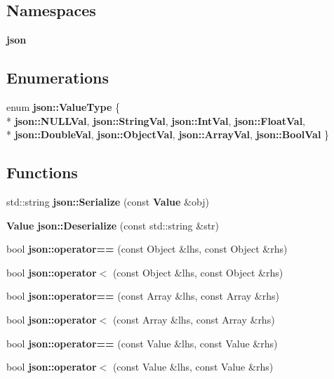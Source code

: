 \subsection*{Namespaces}
\begin{DoxyCompactItemize}
\item 
 {\bf json}
\end{DoxyCompactItemize}
\subsection*{Enumerations}
\begin{DoxyCompactItemize}
\item 
enum {\bf json\+::\+Value\+Type} \{ \\*
{\bf json\+::\+N\+U\+L\+L\+Val}, 
{\bf json\+::\+String\+Val}, 
{\bf json\+::\+Int\+Val}, 
{\bf json\+::\+Float\+Val}, 
\\*
{\bf json\+::\+Double\+Val}, 
{\bf json\+::\+Object\+Val}, 
{\bf json\+::\+Array\+Val}, 
{\bf json\+::\+Bool\+Val}
 \}
\end{DoxyCompactItemize}
\subsection*{Functions}
\begin{DoxyCompactItemize}
\item 
std\+::string {\bf json\+::\+Serialize} (const {\bf Value} \&obj)
\item 
{\bf Value} {\bf json\+::\+Deserialize} (const std\+::string \&str)
\item 
bool {\bf json\+::operator==} (const Object \&lhs, const Object \&rhs)
\item 
bool {\bf json\+::operator$<$} (const Object \&lhs, const Object \&rhs)
\item 
bool {\bf json\+::operator==} (const Array \&lhs, const Array \&rhs)
\item 
bool {\bf json\+::operator$<$} (const Array \&lhs, const Array \&rhs)
\item 
bool {\bf json\+::operator==} (const Value \&lhs, const Value \&rhs)
\item 
bool {\bf json\+::operator$<$} (const Value \&lhs, const Value \&rhs)
\end{DoxyCompactItemize}
